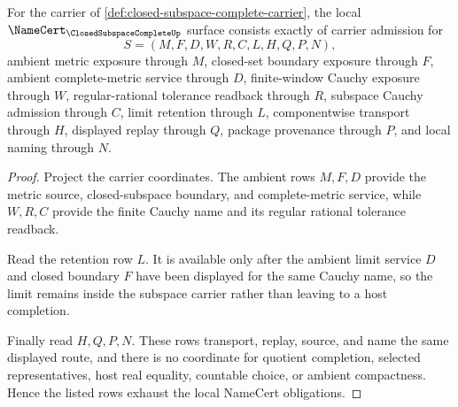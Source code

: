 \begin{theorem}
\label{thm:closed-subspace-complete-namecert-obligations}
For the carrier of \autoref{def:closed-subspace-complete-carrier}, the local $\NameCert_{\ClosedSubspaceCompleteUp}$ surface consists exactly of carrier admission for
$$
S=(M,F,D,W,R,C,L,H,Q,P,N),
$$
ambient metric exposure through $M$, closed-set boundary exposure through $F$, ambient complete-metric service through $D$, finite-window Cauchy exposure through $W$, regular-rational tolerance readback through $R$, subspace Cauchy admission through $C$, limit retention through $L$, componentwise transport through $H$, displayed replay through $Q$, package provenance through $P$, and local naming through $N$.
\end{theorem}
\begin{proof}
Project the carrier coordinates. The ambient rows $M,F,D$ provide the metric source, closed-subspace boundary, and complete-metric service, while $W,R,C$ provide the finite Cauchy name and its regular rational tolerance readback.

Read the retention row $L$. It is available only after the ambient limit service $D$ and closed boundary $F$ have been displayed for the same Cauchy name, so the limit remains inside the subspace carrier rather than leaving to a host completion.

Finally read $H,Q,P,N$. These rows transport, replay, source, and name the same displayed route, and there is no coordinate for quotient completion, selected representatives, host real equality, countable choice, or ambient compactness. Hence the listed rows exhaust the local NameCert obligations.
\end{proof}

